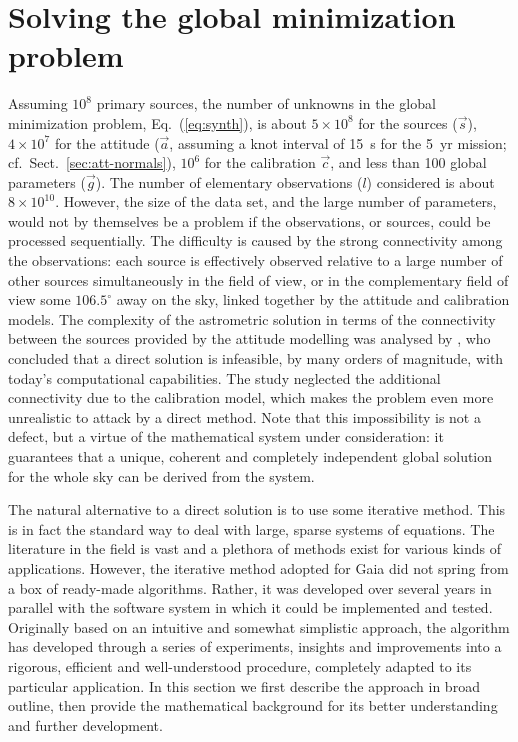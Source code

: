 \documentclass[structabstract]{aa}
\begin{document}
\section{Solving the global minimization problem} \label{sec:numerical}

Assuming $10^8$ primary sources, 
the number of unknowns in the global minimization problem, Eq.~(\ref{eq:synth}),
is about $5\times 10^8$ for the sources ($\vec{s}$), $4\times 10^7$ for the
attitude ($\vec{a}$, assuming a knot interval of 15~s for the 5~yr mission;
cf.\ Sect.~\ref{sec:att-normals}), $10^6$ for the calibration $\vec{c}$, and less than
100 global parameters ($\vec{g}$). The number of elementary observations
($l$) considered is about $8\times 10^{10}$. However, the size of the data
set, and the large number of parameters, would not by themselves be a
problem if the observations, or sources, could be processed sequentially.
The difficulty is caused by the strong connectivity among the observations:
each source is effectively observed relative to a large number of other sources
simultaneously in the field of view, or in the complementary field of view
some $106.5^\circ$ away on the sky, linked together by the attitude and
calibration models. The complexity of the astrometric solution in terms
of the connectivity between the sources provided by the attitude modelling
was analysed by \citet{bombrun+09}, who concluded that a direct solution
is infeasible, by many orders of magnitude, with today's computational
capabilities. The study neglected the additional connectivity due to
the calibration model, which makes the problem even more unrealistic to
attack by a direct method. Note that this impossibility is not a defect, 
but a virtue of the mathematical system under consideration: 
it guarantees that a unique, coherent  and completely independent 
global solution for the whole sky can be derived from the system.

The natural alternative to a direct solution is to use some iterative
method. This is in fact the standard way to deal with large, sparse systems
of equations. The literature in the field is vast and a plethora of methods
exist for various kinds of applications. However, the iterative method
adopted for Gaia did not spring from a box of ready-made algorithms.
Rather, it was developed over several years in parallel with the software
system in which it could be implemented and tested. Originally based on
an intuitive and somewhat simplistic approach, the algorithm has developed
through a series of experiments, insights and improvements into a rigorous,
efficient and well-understood procedure, completely adapted to its
particular application. In this section we first describe the approach
in broad outline, then provide the mathematical background for its better
understanding and further development.
\end{document}

